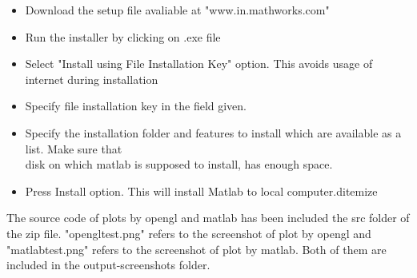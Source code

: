 \begin{enbref}
\begin{itemize}
\item Download the setup file avaliable at "www.in.mathworks.com"
\item Run the installer by clicking on .exe file
\item Select "Install using File Installation Key" option. This avoids usage of internet during installation
\item Specify file installation key in the field given.
\item Specify the installation folder and features to install which are available as a list. Make sure that \\
disk on which matlab is supposed to install, has enough space.
\item Press Install option. This will install Matlab to local computer.d{itemize}
\end{itemize}
\end{enbref}

The source code of plots by opengl and matlab has been included the src folder of the zip file. "opengltest.png" refers to the screenshot of plot by opengl and "matlabtest.png" refers to the screenshot of plot by matlab. Both of them are included in the 
output-screenshots folder.

